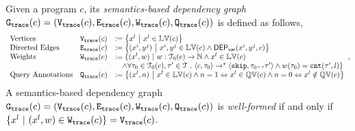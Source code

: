 \begin{defn}
\label{def:trace_graph}
Given a program ${c}$,
its \emph{semantics-based dependency graph} 
$\mathtt{{G_{trace}}}({c}) = (\mathtt{{V_{trace}}}({c}), \mathtt{{E_{trace}}}({c}), \mathtt{{W_{trace}}}({c}), \mathtt{{Q_{trace}}}({c}))$ is defined as follows,
{\small
\[
\begin{array}{lll}
  \text{Vertices} &
  \traceV({c}) & := \left\{ 
  x^l
  ~ \middle\vert ~ x^l \in \lvar(c)
  \right\}
  \\
  \text{Directed Edges} &
  \traceE({c}) & := 
  \left\{ 
  (x^i, y^j) 
  ~ \middle\vert ~
  x^i, y^j \in \lvar(c) \land \vardep(x^i, y^j, c) 
  \right\}
  \\
  \text{Weights} &
  \traceW({c}) & := 
  \{ 
  (x^l, w) 
  ~ \vert ~ 
  w : \mathcal{T}_0(c) \to \mathbb{N}
  \land
  x^l \in \lvar(c) 
  \\ & &
  \quad \land
  \forall \trace_0 \in \mathcal{T}_0(c), \trace' \in \mathcal{T} \st \config{{c}, \trace_0} \to^{*} 
  \config{\eskip, \trace_0\tracecat\trace'} 
  \land w(\trace_0) = \vcounter(\trace', l) \}  
  \\
  \text{Query Annotations} &
  \traceF({c}) & := 
\left\{(x^l, n)  
~ \middle\vert ~
 x^l \in \lvar(c) \land
n = 1 \Leftrightarrow x^l \in \qvar(c) \land n = 0 \Leftrightarrow  x^l \notin \qvar(c)
\right\}
\end{array},
\]
}
A semantics-based dependency graph $\mathtt{{G_{trace}}}({c})= (\mathtt{{V_{trace}}}({c}), \mathtt{{E_{trace}}}({c}), \mathtt{{W_{trace}}}({c}), \mathtt{{Q_{trace}}}({c}))$ 
is \emph{well-formed} if and only if $ \{x^l \ |\ (x^l,w)\in \mathtt{{W_{trace}}}({c})\} = \mathtt{{V_{trace}}}({c}) $.
\end{defn}


